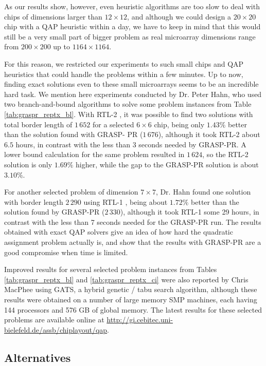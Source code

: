 As our results show, however, even heuristic algorithms are too slow to deal
with chips of dimensions larger than $12 \times 12$, and although we could
design a $20 \times 20$ chip with a QAP heuristic within a day, we have to keep
in mind that this would still be a very small part of bigger problem as real
microarray dimensions range from $200 \times 200$ up to $1164 \times 1164$.

For this reason, we restricted our experiments to such small chips and QAP
heuristics that could handle the problems within a few minutes. Up to now,
finding exact solutions even to these small microarrays seems to be an
incredible hard task. We mention here experiments conducted by Dr. Peter Hahn,
who used two branch-and-bound algorithms to solve some problem instances from
Table \ref{tab:graspr_reptx_bl}. With RTL-2 \citep{Adams}, it was possible to
find two solutions with total border length of $1\,652$ for a selected
$6\times 6$ chip, being only $1.43\%$ better than the solution found with GRASP-
PR ($1\,676$), although it took RTL-2 about $6.5$ hours, in contrast with the
less than 3 seconds needed by GRASP-PR. A lower bound calculation for the same
problem resulted in $1\,624$, so the RTL-2 solution is only $1.69\%$ higher,
while the gap to the GRASP-PR solution is about $3.10\%$.

For another selected problem of dimension $7\times 7$, Dr. Hahn found one
solution with border length $2\,290$ using RTL-1 \citep{Hahn1998}, being about
$1.72\%$ better than the solution found by GRASP-PR ($2\,330$), although it took
RTL-1 some 29 hours, in contrast with the less than 7 seconds needed for the
GRASP-PR run. The results obtained with exact QAP solvers give an idea of how
hard the quadratic assignment problem actually is, and show that the results
with GRASP-PR are a good compromise when time is limited.

Improved results for several selected problem instances from Tables
\ref{tab:graspr_reptx_bl} and \ref{tab:graspr_reptx_ci} were also reported by
Chris MacPhee using GATS, a hybrid genetic / tabu search algorithm, although
these results were obtained on a number of large memory SMP machines, each
having 144 processors and 576 GB of global memory. The latest results for these
selected problems are available online at \url{
http://gi.cebitec.uni-bielefeld.de/assb/chiplayout/qap}.

\subsection{Alternatives}

